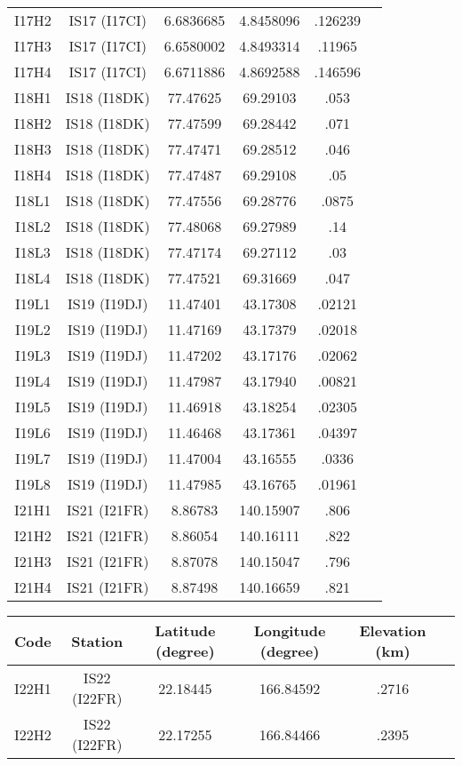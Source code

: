 \documentclass[a4paper, 10pt]{report}
\begin{document}
{\begin{center}
\begin{tabular}{|c|c|c|c|c|c|}
I17H2&	IS17 (I17CI)&	 	6.6836685&	4.8458096&	.126239\\
I17H3&	IS17 (I17CI)&	 	6.6580002&	4.8493314&	.11965\\
I17H4&	IS17 (I17CI)&	 	6.6711886&	4.8692588&	.146596\\
I18H1&	IS18 (I18DK)&	 	77.47625&	69.29103&	.053\\
I18H2&	IS18 (I18DK)&	 	77.47599&	69.28442&	.071\\
I18H3&	IS18 (I18DK)&	 	77.47471&	69.28512&	.046\\
I18H4&	IS18 (I18DK)&	 	77.47487&	69.29108&	.05\\
I18L1&	IS18 (I18DK)&	 	77.47556&	69.28776&	.0875\\
I18L2&	IS18 (I18DK)&	 	77.48068&	69.27989&	.14\\
I18L3&	IS18 (I18DK)&	 	77.47174&	69.27112&	.03\\
I18L4&	IS18 (I18DK)&	 	77.47521&	69.31669&	.047\\
I19L1&	IS19 (I19DJ)&	 	11.47401&	43.17308&	.02121\\
I19L2&	IS19 (I19DJ)&	 	11.47169&	43.17379&	.02018\\
I19L3&	IS19 (I19DJ)&	 	11.47202&	43.17176&	.02062\\
I19L4&	IS19 (I19DJ)&	 	11.47987&	43.17940&	.00821\\
I19L5&	IS19 (I19DJ)&	 	11.46918&	43.18254&	.02305\\
I19L6&	IS19 (I19DJ)&	 	11.46468&	43.17361&	.04397\\
I19L7&	IS19 (I19DJ)&	 	11.47004&	43.16555&	.0336\\
I19L8&	IS19 (I19DJ)&	 	11.47985&	43.16765&	.01961\\
I21H1&	IS21 (I21FR)&	 	8.86783&	140.15907&	.806\\
I21H2&	IS21 (I21FR)&	 	8.86054&	140.16111&	.822\\
I21H3&	IS21 (I21FR)&	 	8.87078&	140.15047&	.796\\
I21H4&	IS21 (I21FR)&	 	8.87498&	140.16659&	.821\\
\hline
\end{tabular}
\end{center}
\begin{center}
\begin{tabular}{|c|c|c|c|c|c|}
\hline
Code&	Station&	Latitude (degree)&	Longitude (degree)&	Elevation (km)\\
\hline
I22H1&	IS22 (I22FR)&	 	22.18445&	166.84592&	.2716\\
I22H2&	IS22 (I22FR)&	 	22.17255&	166.84466&	.2395\\

\end{tabular}
\end{center}}
\end{document}
